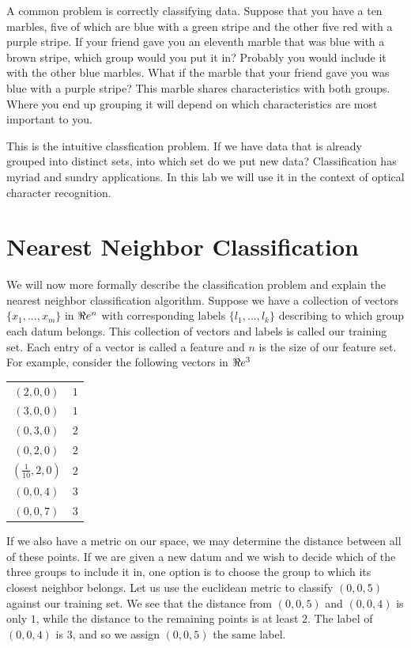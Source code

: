 A common problem is correctly classifying data.  
Suppose that you have a ten marbles, five of which are blue with a green stripe and the other five red with a purple stripe.  
If your friend gave you an eleventh marble that was blue with a brown stripe, which group would you put it in?  
Probably you would include it with the other blue marbles.  
What if the marble that your friend gave you was blue with a purple stripe?  
This marble shares characteristics with both groups.  
Where you end up grouping it will depend on which characteristics are most important to you.

This is the intuitive classfication problem.  
If we have data that is already grouped into distinct sets, into which set do we put new data?  
Classification has myriad and sundry applications.  
In this lab we will use it in the context of optical character recognition.

\section*{Nearest Neighbor Classification}

We will now more formally describe the classification problem and explain the nearest neighbor classification algorithm.  
Suppose we have a collection of vectors $\{x_1, ..., x_m\}$ in $\Re e^n$ with corresponding labels $\{l_1, ..., l_k\}$ describing to which group each datum belongs.  
This collection of vectors and labels is called our training set.  
Each entry of a vector is called a feature and $n$ is the size of our feature set.  
For example, consider the following vectors in $\Re e^3$

\begin{center}
\begin{tabular}{cc}
$(2,0,0)$ & $1$ \\
$(3,0,0)$ & $1$ \\
$(0,3,0)$ & $2$ \\
$(0,2,0)$ & $2$ \\
$(\frac{1}{10},2,0)$ & $2$ \\
$(0,0,4)$ & $3$ \\
$(0,0,7)$ & $3$ \\
\end{tabular}
\end{center}

If we also have a metric on our space, we may determine the distance between all of these points.  
If we are given a new datum and we wish to decide which of the three groups to include it in, one option is to choose the group to which its closest neighbor belongs.  
Let us use the euclidean metric to classify $(0,0,5)$ against our training set.  
We see that the distance from $(0,0,5)$ and $(0,0,4)$ is only $1$, while the distance to the remaining points is at least $2$.  
The label of $(0,0,4)$ is $3$, and so we assign $(0,0,5)$ the same label.

